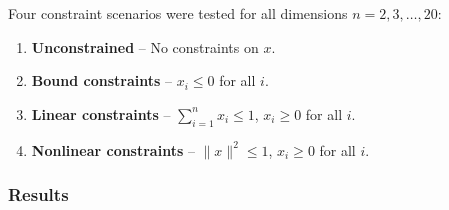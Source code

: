 \documentclass[11pt,a4paper]{article}
\begin{document}
Four constraint scenarios were tested for all dimensions $n = 2, 3, \ldots, 20$:

\begin{enumerate}[label=\textbf{Case \arabic*:}, leftmargin=*]
    \item \textbf{Unconstrained} -- No constraints on $x$.
    \item \textbf{Bound constraints} -- $x_i \le 0$ for all $i$.
    \item \textbf{Linear constraints} -- $\sum_{i=1}^n x_i \le 1$, $x_i \ge 0$ for all $i$.
    \item \textbf{Nonlinear constraints} -- $\lVert x \rVert^2 \le 1$, $x_i \ge 0$ for all $i$.
\end{enumerate}

\subsubsection{Results}
\end{document}
